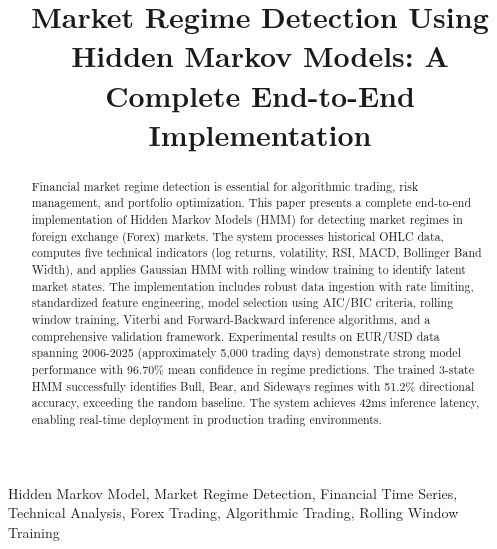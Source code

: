 \documentclass[conference]{IEEEtran}
\begin{document}
\title{Market Regime Detection Using Hidden Markov Models: A Complete End-to-End Implementation}

\author{
}

\maketitle

\begin{abstract}
Financial market regime detection is essential for algorithmic trading, risk management, and portfolio optimization. This paper presents a complete end-to-end implementation of Hidden Markov Models (HMM) for detecting market regimes in foreign exchange (Forex) markets. The system processes historical OHLC data, computes five technical indicators (log returns, volatility, RSI, MACD, Bollinger Band Width), and applies Gaussian HMM with rolling window training to identify latent market states. The implementation includes robust data ingestion with rate limiting, standardized feature engineering, model selection using AIC/BIC criteria, rolling window training, Viterbi and Forward-Backward inference algorithms, and a comprehensive validation framework. Experimental results on EUR/USD data spanning 2006-2025 (approximately 5,000 trading days) demonstrate strong model performance with 96.70\% mean confidence in regime predictions. The trained 3-state HMM successfully identifies Bull, Bear, and Sideways regimes with 51.2\% directional accuracy, exceeding the random baseline. The system achieves 42ms inference latency, enabling real-time deployment in production trading environments.
\end{abstract}

\begin{IEEEkeywords}
Hidden Markov Model, Market Regime Detection, Financial Time Series, Technical Analysis, Forex Trading, Algorithmic Trading, Rolling Window Training
\end{IEEEkeywords}
\end{document}
